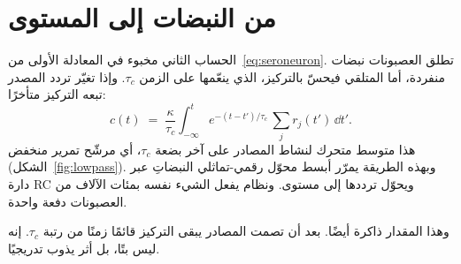 \section{من النبضات إلى المستوى}

الحساب الثاني مخبوء في المعادلة الأولى من~\eqref{eq:seroneuron}. تطلق العصبونات نبضات منفردة، أما المتلقي فيحسّ بالتركيز، الذي ينعّمها على الزمن $\tau_c$. وإذا تغيّر تردد المصدر تبعه التركيز متأخرًا:
\begin{equation}
c(t) \;=\; \frac{\kappa}{\tau_c}\int_{-\infty}^{t} e^{-(t-t')/\tau_c}\,\sum_j r_j(t')\,\dd t' .
\label{eq:lowpass}
\end{equation}
هذا متوسط متحرك لنشاط المصادر على آخر بضعة $\tau_c$، أي مرشّح تمرير منخفض (الشكل~\ref{fig:lowpass}). وبهذه الطريقة يمرّر أبسط محوّل رقمي-تماثلي النبضاتِ عبر دارة \foreignlanguage{english}{RC} ويحوّل ترددها إلى مستوى. ونظام  يفعل الشيء نفسه بمئات الآلاف من العصبونات دفعة واحدة.

وهذا المقدار ذاكرة أيضًا. بعد أن تصمت المصادر يبقى التركيز قائمًا زمنًا من رتبة $\tau_c$. إنه ليس بتًا، بل أثر يذوب تدريجيًا.

